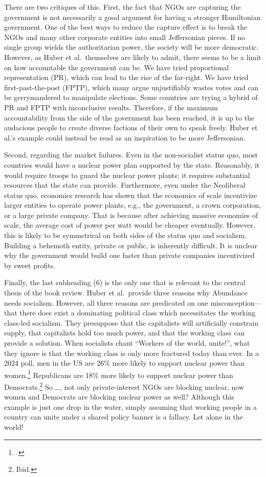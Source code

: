 \documentclass[12pt]{article}
\begin{document}
There are two critiques of this. First, the fact that NGOs are capturing the government is not necessarily a good argument for having a stronger Hamiltonian government. One of the best ways to reduce the capture effect is to break the NGOs and many other corporate entities into small Jeffersonian pieces. If no single group wields the authoritarian power, the society will be more democratic. However, as Huber et al.\ themselves are likely to admit, there seems to be a limit on how accountable the government can be. We have tried proportional representation (PR), which can lead to the rise of the far-right. We have tried first-past-the-post (FPTP), which many argue unjustifiably wastes votes and can be gerrymandered to manipulate elections. Some countries are trying a hybrid of PR and FPTP with inconclusive results. Therefore, if the maximum accountability from the side of the government has been reached, it is up to the audacious people to create diverse factions of their own to speak freely. Huber et al.'s example could instead be read as an inspiration to be more Jeffersonian.

Second, regarding the market failures. Even in the non-socialist status quo, most countries would have a nuclear power plan supported by the state. Reasonably, it would require troops to guard the nuclear power plants; it requires substantial resources that the state can provide. Furthermore, even under the Neoliberal status quo, economics research has shown that the economics of scale incentivize larger entities to operate power plants, e.g., the government, a crown corporation, or a large private company. That is because after achieving massive economies of scale, the average cost of power per watt would be cheaper eventually. However, this is likely to be symmetrical on both sides of the status quo and socialism. Building a behemoth entity, private or public, is inherently difficult. It is unclear why the government would build one faster than private companies incentivized by sweet profits.

Finally, the last subheading (6) is the only one that is relevant to the central thesis of the book review. Huber et al.\ provide three reasons why Abundance needs socialism. However, all three reasons are predicated on one misconception--- that there does exist a dominating political class which necessitates the working class-led socialism. They presuppose that the capitalists will artificially constrain supply, that capitalists hold too much power, and that the working class can provide a solution. When socialists chant ``Workers of the world, unite!'', what they ignore is that the working class is only more fractured today than ever. In a 2024 poll, men in the US are 26\% more likely to support nuclear power than women.\footcite{leppertGrowingShareAmericans2024} Republicans are 18\% more likely to support nuclear power than Democrats.\footnote{Ibid.} So \dots, not only private-interest NGOs are blocking nuclear, now women and Democrats are blocking nuclear power as well? Although this example is just one drop in the water, simply assuming that working people in a country can unite under a shared policy banner is a fallacy. Let alone in the world!
\end{document}

